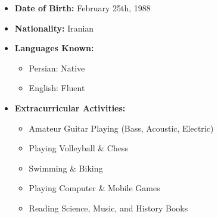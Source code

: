 \documentclass{cv}
\begin{document}
\begin{itemize}

\item
\textbf{Date of Birth:}
February 25th, 1988


\item
{\bf Nationality:}
Iranian

\item
\textbf{Languages Known:}
\begin{itemize}

\item
Persian: Native

\item
English: Fluent
%
\end{itemize}

\item
\textbf{Extracurricular Activities:}

\begin{itemize}
\item
Amateur Guitar Playing (Bass, Acoustic, Electric)
\item
Playing Volleyball \& Chess
\item
Swimming \& Biking
\item
Playing Computer \& Mobile Games
\item
Reading Science, Music, and History Books
\end{itemize} 


\end{itemize}

\end{document}
